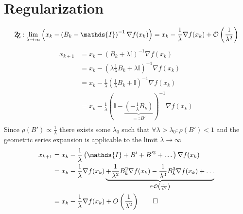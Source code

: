 \documentclass[oneside, a4paper]{book}
\newcommand\br[1]{\left(#1\right)}
\begin{document}
\chapter{Regularization}
\[
  \mathrm{Z\kern-.3em\raise-0.5ex\hbox{Z}}: 
  \lim_{\lambda\to\infty} \br{x_k - \br{B_k - \mathds{I}}^{-1} \nabla f(x_k) }= x_k - \frac{1}{\lambda}\nabla f(x_k) + \mathcal{O}\br{\frac{1}{\lambda^2}}
\]
\begin{align*}
  x_{k+1} &= x_k - \br{B_k + \lambda \mathds{\mathds{I}}}^{-1} \nabla f(x_k)\\
  &= x_k - \br{\lambda \frac{1}{\lambda} B_k + \lambda \mathds{I}}^{-1} \nabla f(x_k)\\
  &= x_k - \frac{1}{\lambda}\br{\frac{1}{\lambda} B_k + \mathds{I}}^{-1} \nabla f(x_k)\\
  &= x_k - \frac{1}{\lambda}\br{\mathds{I} -\underbrace{\br{-\frac{1}{\lambda} B_k}}_{=: B'}}^{-1} \nabla f(x_k)\\
\end{align*}
Since $\rho(B') \propto \frac{1}{\lambda}$ there exists some $\lambda_0$ such that $\forall \lambda>\lambda_0: \rho(B')<1$ and the geometric series expansion is applicable to the limit $\lambda \to \infty$
\begin{align*}
  x_{k+1} &=  x_k - \frac{1}{\lambda}\br{\mathds{I} + B' + B'^2 + \dots} \nabla f(x_k)\\
  &=  x_k - \frac{1}{\lambda} \nabla f(x_k) \underbrace{
    + \frac{1}{\lambda^2} B_k^2 \nabla f(x_k) 
    - \frac{1}{\lambda^3} B_k^3 \nabla f(x_k) 
    + \dots
    }_{\in\mathcal{O}\br{ \frac{1}{\lambda ^2} }}\\
  &=  x_k - \frac{1}{\lambda} \nabla f(x_k) + O\br{\frac{1}{\lambda^2}}\qed\\
\end{align*}
\end{document}
